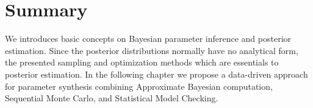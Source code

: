 \section{Summary}
We introduces basic concepts on Bayesian parameter inference and posterior estimation. Since the
posterior distributions normally have no analytical form, the presented sampling and
optimization methods which are essentials to posterior estimation. In the following chapter we
propose a data-driven approach for parameter synthesis combining Approximate Bayesian computation,
Sequential Monte Carlo, and Statistical Model Checking.
